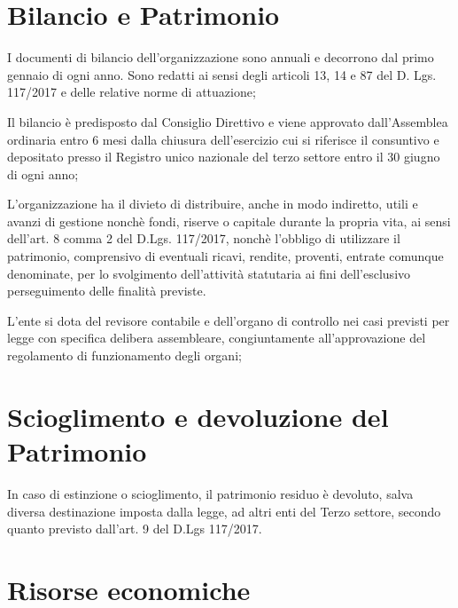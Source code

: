 \documentclass[legalpaper, 11pt]{exam}
\let\tempone\enumerate
\let\temptwo\endenumerate
\renewenvironment{enumerate}{\tempone\addtolength{\itemsep}{-0.45\baselineskip}}{\temptwo}
\begin{document}
\section{Bilancio e Patrimonio}
\begin{enumerate}
 \item I documenti di bilancio dell’organizzazione sono annuali e decorrono dal primo gennaio di ogni anno. Sono redatti ai sensi degli articoli 13, 14 e 87 del D. Lgs. 117/2017 e delle relative norme di attuazione;
 \item Il bilancio è predisposto dal Consiglio Direttivo e viene approvato dall’Assemblea ordinaria entro 6 mesi dalla chiusura dell’esercizio cui si riferisce il consuntivo e depositato presso il Registro unico nazionale del terzo settore entro il 30 giugno di ogni anno;
 \item L’organizzazione ha il divieto di distribuire, anche in modo indiretto, utili e avanzi di gestione nonchè fondi, riserve o capitale durante la propria vita, ai sensi dell’art. 8 comma 2 del D.Lgs. 117/2017, nonchè l’obbligo di utilizzare il patrimonio, comprensivo di eventuali ricavi, rendite, proventi, entrate comunque denominate, per lo svolgimento dell’attività statutaria ai fini dell’esclusivo perseguimento delle finalità previste.
 \item L’ente si dota del revisore contabile e dell’organo di controllo nei casi previsti per legge con specifica delibera assembleare, congiuntamente all’approvazione del regolamento di funzionamento degli organi;
 
\end{enumerate}

\section{Scioglimento e devoluzione del Patrimonio}
\begin{enumerate}
 \item In caso di estinzione o scioglimento, il patrimonio residuo è devoluto, salva diversa destinazione imposta dalla legge, ad altri enti del Terzo settore, secondo quanto previsto dall’art. 9 del D.Lgs 117/2017.
\end{enumerate}

\section{Risorse economiche}
\end{document}

